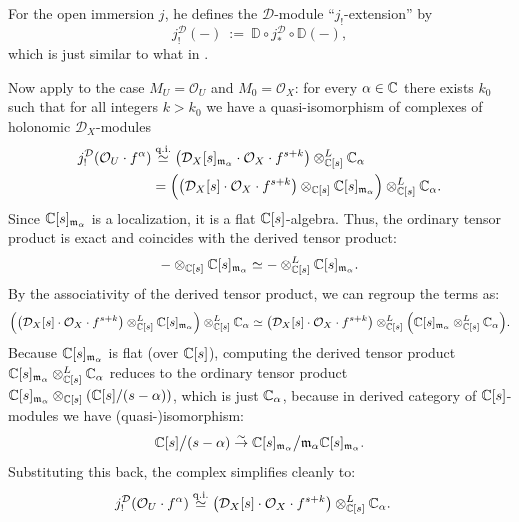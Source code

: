 \begin{remark}
\begin{enumerate}
              For the open immersion $j$, he defines the $\mathcal D$-module ``$j_!$-extension'' by
              \[
                  j_!^{\mathcal D}(-)\ :=\ \mathbb D\circ j_*^{\mathcal D}\circ \mathbb D(-),
              \]
              which is just similar to what in \cite[Definition~3.2.13]{hotta2008d}.

              Now apply \cite[Theorem~2.10(2) and (3)]{Wu2020ComparisonNearbyCyclesBfunctions}
              to the case $M_U=\mathcal O_U$ and $M_0=\mathcal O_X$:
              for every $\alpha\in\mathbb{C}$ there exists $k_0$ such that for all integers $k>k_0$ we have a
              quasi-isomorphism of complexes of holonomic $\mathcal D_X$-modules
              \begin{align*}
                  j_!^{\mathcal D}(\mathcal O_U\cdot f^\alpha) & \stackrel{{\mathrm{q.i.}}}{\simeq} \bigl(\mathcal D_X[s]_{\mathfrak{m}_\alpha}\cdot \mathcal O_X\cdot f^{s+k}\bigr) \otimes^L_{\mathbb{C}[s]} \mathbb{C}_\alpha  \\
                                                               & = \Bigl(\bigl(\mathcal D_X[s]\cdot \mathcal O_X\cdot f^{s+k}\bigr)\otimes_{\mathbb{C}[s]} \mathbb{C}[s]_{\mathfrak{m}_\alpha}\Bigr) \otimes^L_{\mathbb{C}[s]} \mathbb{C}_\alpha.
              \end{align*}
              Since $\mathbb{C}[s]_{\mathfrak{m}_\alpha}$ is a localization, it is a flat $\mathbb{C}[s]$-algebra. Thus, the ordinary tensor product is exact and coincides with the derived tensor product:
              \[
                  - \otimes_{\mathbb{C}[s]} \mathbb{C}[s]_{\mathfrak{m}_\alpha} \simeq - \otimes^L_{\mathbb{C}[s]} \mathbb{C}[s]_{\mathfrak{m}_\alpha}.
              \]
              By the associativity of the derived tensor product, we can regroup the terms as:
              \[
                  \Bigl( \bigl(\mathcal D_X[s]\cdot \mathcal O_X\cdot f^{s+k}\bigr)\otimes^L_{\mathbb{C}[s]} \mathbb{C}[s]_{\mathfrak{m}_\alpha} \Bigr) \otimes^L_{\mathbb{C}[s]} \mathbb{C}_\alpha
                  \simeq \bigl(\mathcal D_X[s]\cdot \mathcal O_X\cdot f^{s+k}\bigr) \otimes^L_{\mathbb{C}[s]} \Bigl( \mathbb{C}[s]_{\mathfrak{m}_\alpha} \otimes^L_{\mathbb{C}[s]} \mathbb{C}_\alpha \Bigr).
              \]
              Because $\mathbb{C}[s]_{\mathfrak{m}_\alpha}$ is flat (over $\mathbb{C}[s]$), computing the derived tensor product $\mathbb{C}[s]_{\mathfrak{m}_\alpha} \otimes^L_{\mathbb{C}[s]} \mathbb{C}_\alpha$
              reduces to the ordinary tensor product $\mathbb{C}[s]_{\mathfrak{m}_\alpha} \otimes_{\mathbb{C}[s]} (\mathbb{C}[s]/(s-\alpha))$, which is just $\mathbb{C}_\alpha$,
              because in derived category of $\mathbb{C}[s]$-modules we have (quasi-)isomorphism:
              \[
                  \mathbb{C}[s]\big/(s-\alpha) \stackrel{\sim}{\to}\mathbb{C}[s]_{\mathfrak{m}_\alpha} \big/\mathfrak{m}_\alpha\mathbb{C}[s]_{\mathfrak{m}_\alpha}.
              \]
              Substituting this back, the complex simplifies cleanly to:
              \begin{align*}
                  j_!^{\mathcal D}(\mathcal O_U\cdot f^\alpha) & \stackrel{\mathrm{q.i.}}{\simeq} \bigl(\mathcal D_X[s]\cdot \mathcal O_X\cdot f^{s+k}\bigr)\otimes^L_{\mathbb{C}[s]} \mathbb{C}_\alpha.
              \end{align*}


\end{enumerate}
\end{remark}
